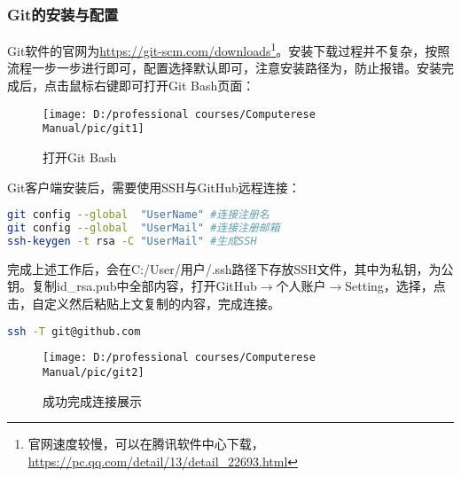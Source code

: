\documentclass[cn, twoside]{myModel}
\begin{document}
		\subsubsection{Git的安装与配置}
			\par{}Git软件的官网为\url{https://git-scm.com/downloads}\footnote[1]{官网速度较慢，可以在腾讯软件中心下载，\url{https://pc.qq.com/detail/13/detail\_22693.html}}。安装下载过程并不复杂，按照流程一步一步进行即可，配置选择默认即可，注意安装路径为，防止报错。安装完成后，点击鼠标右键即可打开Git Bash页面：
			\begin{figure}[H]
				\centering
				\texttt{[image: D:/professional courses/Computerese Manual/pic/git1]}
				\caption{打开Git Bash}
				\label{pic3}
			\end{figure}
			\par{}Git客户端安装后，需要使用SSH与GitHub远程连接：
			\begin{lstlisting}[language=bash, numbers=none]
git config --global  "UserName" #连接注册名
git config --global  "UserMail" #连接注册邮箱
ssh-keygen -t rsa -C "UserMail" #生成SSH
			\end{lstlisting}
			完成上述工作后，会在C:/User/用户/.ssh路径下存放SSH文件，其中为私钥，为公钥。复制id\_rsa.pub中全部内容，打开GitHub$\rightarrow$个人账户$\rightarrow$Setting，选择，点击，自定义然后粘贴上文复制的内容，完成连接。
			\begin{lstlisting}[language=bash, numbers=none]
ssh -T git@github.com 
			\end{lstlisting}
			\begin{figure}[H]
				\centering
				\texttt{[image: D:/professional courses/Computerese Manual/pic/git2]}
				\caption{成功完成连接展示}
				\label{pic4}
			\end{figure}
\end{document}
